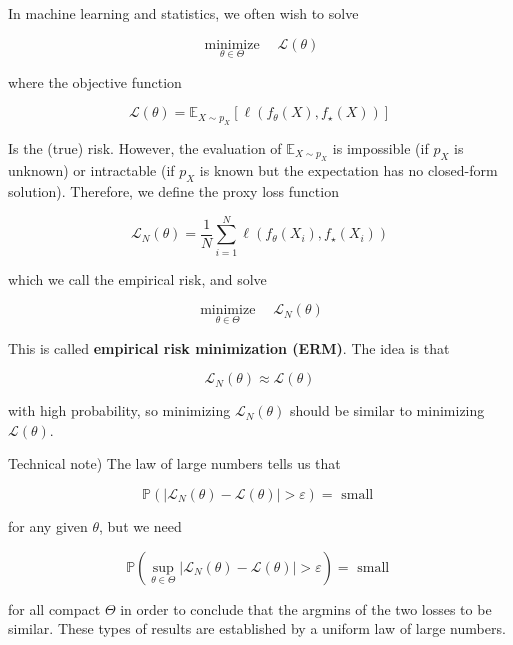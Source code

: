 \documentclass{report}
\begin{document}
\begin{definition}
    In machine learning and statistics, we often wish to solve

    $$
    \underset{\theta \in \Theta}{\operatorname{minimize}} \quad \mathcal{L}(\theta)
    $$

    where the objective function

    $$
    \mathcal{L}(\theta)=\mathbb{E}_{X \sim p_{X}}\left[\ell\left(f_{\theta}(X), f_{\star}(X)\right)\right]
    $$

    Is the (true) risk. However, the evaluation of $\mathbb{E}_{X \sim p_{X}}$ is impossible (if $p_{X}$ is unknown) or intractable (if $p_{X}$ is known but the expectation has no closed-form solution). Therefore, we define the proxy loss function

    $$
    \mathcal{L}_{N}(\theta)=\frac{1}{N} \sum_{i=1}^{N} \ell\left(f_{\theta}\left(X_{i}\right), f_{\star}\left(X_{i}\right)\right)
    $$

    which we call the empirical risk, and solve

    $$
    \underset{\theta \in \Theta}{\operatorname{minimize}} \quad \mathcal{L}_{N}(\theta)
    $$

    This is called \textbf{empirical risk minimization (ERM)}. The idea is that

    $$
    \mathcal{L}_{N}(\theta) \approx \mathcal{L}(\theta)
    $$

    with high probability, so minimizing $\mathcal{L}_{N}(\theta)$ should be similar to minimizing $\mathcal{L}(\theta)$.
\end{definition}

\begin{concept}
    Technical note) The law of large numbers tells us that

    $$
    \mathbb{P}\left(\left|\mathcal{L}_{N}(\theta)-\mathcal{L}(\theta)\right|>\varepsilon\right)=\text { small }
    $$

    for any given $\theta$, but we need

    $$
    \mathbb{P}\left(\sup _{\theta \in \Theta}\left|\mathcal{L}_{N}(\theta)-\mathcal{L}(\theta)\right|>\varepsilon\right)=\text { small }
    $$

    for all compact $\Theta$ in order to conclude that the argmins of the two losses to be similar. These types of results are established by a uniform law of large numbers.
\end{concept}
\end{document}
